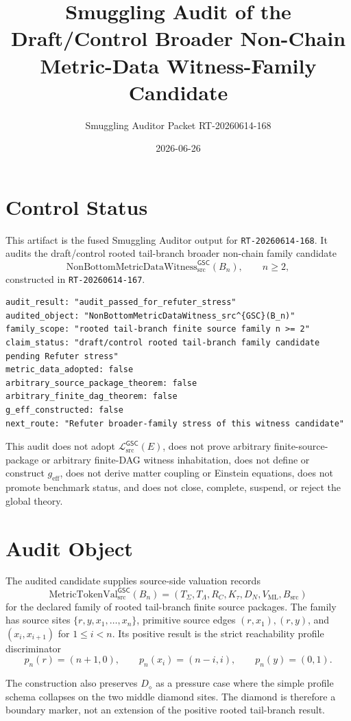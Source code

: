 \documentclass[11pt]{article}
\title{Smuggling Audit of the Draft/Control Broader Non-Chain Metric-Data Witness-Family Candidate}
\author{Smuggling Auditor Packet RT-20260614-168}
\date{2026-06-26}
\newcommand{\MetricTokenVal}{\mathrm{MetricTokenVal}_{\mathrm{src}}^{\mathsf{GSC}}}
\newcommand{\Witness}{\mathrm{NonBottomMetricDataWitness}_{\mathrm{src}}^{\mathsf{GSC}}}
\newcommand{\MetricData}{\mathcal{L}_{\mathrm{src}}^{\mathsf{GSC}}}
\newcommand{\geff}{g_{\mathrm{eff}}}
\newcommand{\Bn}{B_n}
\newcommand{\Diamond}{D_{\diamond}}
\begin{document}
\maketitle

\section{Control Status}

This artifact is the fused Smuggling Auditor output for
\texttt{RT-20260614-168}. It audits the draft/control rooted tail-branch
broader non-chain family candidate
\[
  \Witness(\Bn),\qquad n\ge 2,
\]
constructed in \texttt{RT-20260614-167}.

\begin{verbatim}
audit_result: "audit_passed_for_refuter_stress"
audited_object: "NonBottomMetricDataWitness_src^{GSC}(B_n)"
family_scope: "rooted tail-branch finite source family n >= 2"
claim_status: "draft/control rooted tail-branch family candidate pending Refuter stress"
metric_data_adopted: false
arbitrary_source_package_theorem: false
arbitrary_finite_dag_theorem: false
g_eff_constructed: false
next_route: "Refuter broader-family stress of this witness candidate"
\end{verbatim}

This audit does not adopt \(\MetricData(E)\), does not prove arbitrary
finite-source-package or arbitrary finite-DAG witness inhabitation, does not
define or construct \(\geff\), does not derive matter coupling or Einstein
equations, does not promote benchmark status, and does not close, complete,
suspend, or reject the global theory.

\section{Audit Object}

The audited candidate supplies source-side valuation records
\[
  \MetricTokenVal(\Bn)=
  (T_{\Sigma},T_{\Lambda},R_C,K_{\tau},D_N,V_{\mathrm{ML}},B_{\mathrm{src}})
\]
for the declared family of rooted tail-branch finite source packages. The
family has source sites \(\{r,y,x_1,\ldots,x_n\}\), primitive source edges
\((r,x_1),(r,y)\), and \((x_i,x_{i+1})\) for \(1\le i<n\). Its positive result
is the strict reachability profile discriminator
\[
p_n(r)=(n+1,0),\qquad
p_n(x_i)=(n-i,i),\qquad
p_n(y)=(0,1).
\]

The construction also preserves \(\Diamond\) as a pressure case where the
simple profile schema collapses on the two middle diamond sites. The diamond
is therefore a boundary marker, not an extension of the positive rooted
tail-branch result.
\end{document}
